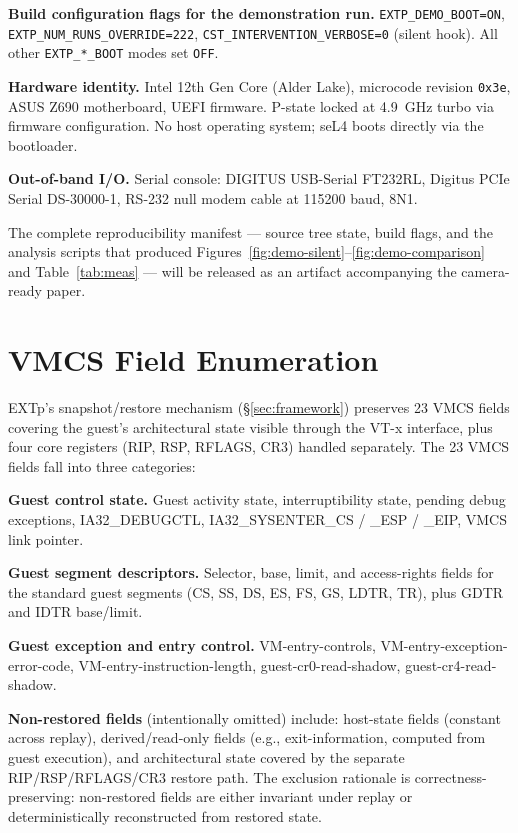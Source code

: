 \documentclass[conference]{IEEEtran}
\begin{document}
\textbf{Build configuration flags for the demonstration run.}
\texttt{EXTP\_DEMO\_BOOT=ON},
\texttt{EXTP\_NUM\_RUNS\_OVERRIDE=222},
\texttt{CST\_INTERVENTION\_VERBOSE=0} (silent hook).
All other \texttt{EXTP\_*\_BOOT} modes set \texttt{OFF}.

\textbf{Hardware identity.} Intel 12th Gen Core (Alder Lake),
microcode revision \texttt{0x3e}, ASUS Z690 motherboard, UEFI
firmware. P-state locked at 4.9~GHz turbo via firmware
configuration. No host operating system; seL4 boots directly via
the bootloader.

\textbf{Out-of-band I/O.} Serial console: DIGITUS USB-Serial
FT232RL, Digitus PCIe Serial DS-30000-1, RS-232 null modem cable
at 115200 baud, 8N1.

The complete reproducibility manifest --- source tree state, build
flags, and the analysis scripts that produced
Figures~\ref{fig:demo-silent}--\ref{fig:demo-comparison} and
Table~\ref{tab:meas} --- will be released as an artifact
accompanying the camera-ready paper.

\section{VMCS Field Enumeration}\label{app:vmcs}

EXTp's snapshot/restore mechanism (\S\ref{sec:framework})
preserves 23 VMCS fields covering the guest's architectural
state visible through the VT-x interface, plus four core
registers (RIP, RSP, RFLAGS, CR3) handled separately. The 23
VMCS fields fall into three categories:

\textbf{Guest control state.} Guest activity state,
interruptibility state, pending debug exceptions, IA32\_DEBUGCTL,
IA32\_SYSENTER\_CS / \_ESP / \_EIP, VMCS link pointer.

\textbf{Guest segment descriptors.} Selector, base, limit, and
access-rights fields for the standard guest segments
(CS, SS, DS, ES, FS, GS, LDTR, TR), plus GDTR and IDTR base/limit.

\textbf{Guest exception and entry control.} VM-entry-controls,
VM-entry-exception-error-code, VM-entry-instruction-length,
guest-cr0-read-shadow, guest-cr4-read-shadow.

\textbf{Non-restored fields} (intentionally omitted) include:
host-state fields (constant across replay), derived/read-only
fields (e.g., exit-information, computed from guest execution),
and architectural state covered by the separate RIP/RSP/RFLAGS/CR3
restore path. The exclusion rationale is correctness-preserving:
non-restored fields are either invariant under replay or
deterministically reconstructed from restored state.
\end{document}
